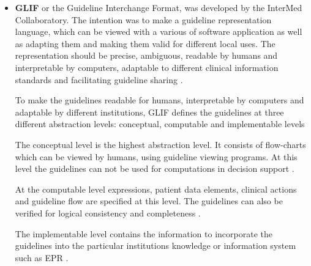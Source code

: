 \begin{itemize}
	\item \textbf{GLIF} or the Guideline Interchange Format, was developed by the InterMed Collaboratory. The intention was to make a guideline representation language, which can be viewed with a various of software application as well as adapting them and making them valid for different local uses. The representation should be precise, ambiguous, readable by humans and interpretable by computers, adaptable to different clinical information standards and facilitating guideline sharing \parencite{Peleg2000}. 

	To make the guidelines readable for humans, interpretable by computers and adaptable by different institutions, GLIF defines the guidelines at three different abstraction levels: conceptual, computable and implementable levels \parencite{DeClercq2008} 
	
	The conceptual level is the highest abstraction level. It consists of
flow-charts which can be viewed by humans, using guideline viewing programs. At this level the guidelines can not
	be used for computations in decision support \parencite{Peleg2000}. 
	
	At the computable level expressions, patient data elements, clinical actions and guideline flow
	are specified at this level. The guidelines can also be verified for logical consistency and completeness \parencite{Peleg2000}.
	
	The implementable level contains the information to incorporate the guidelines into
	the particular institutions knowledge or information system such as EPR \parencite{Peleg2000}.
	

\end{itemize}
